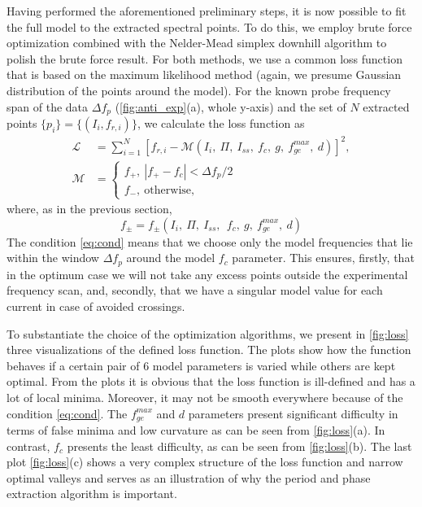 \documentclass[%
 aip,
 amsmath,amssymb,
 reprint,%
]{revtex4-1}
\begin{document}
Having performed the aforementioned preliminary steps, it is now possible to fit the full model to the extracted spectral points. To do this, we employ brute force optimization combined with the Nelder-Mead simplex downhill algorithm\cite{nelder1965} to polish the brute force result. For both methods, we use a common loss function that is based on the maximum likelihood method (again, we presume Gaussian distribution of the points around the model). 
For the known probe frequency span of the data $\Delta f_p$ (\autoref{fig:anti_exp}(a), whole y-axis) and the set of $N$ extracted points $\{p_i\} = \{(I_i, f_{r,i})\}$, we calculate the loss function as
\begin{align}
\mathcal{L} &= \sum_{i=1}^N [f_{r,i} - \mathcal{M}(I_i,\ \Pi, \ I_{ss},\ f_c,\ g,\ f_{ge}^{max},\ d)]^2,\label{eq:loss}\\
\mathcal{M} &= \begin{cases}
f_+,\  |f_+ - f_c|< \Delta f_p/2 \\
f_-,\ \text{otherwise}, \label{eq:cond}
\end{cases}
\end{align}
where, as in the previous section, $$f_{\pm} = f_{\pm}(I_i,\ \Pi,\ I_{ss},\ \ f_c,\ g,\ f_{ge}^{max},\ d)$$
The condition \eqref{eq:cond} means that we choose only the model frequencies that lie within the window $\Delta f_p$ around the model $f_c$ parameter. This ensures, firstly, that in the optimum case we will not take any excess points outside the experimental frequency scan, and, secondly, that we have a singular model value for each current in case of avoided crossings.

To substantiate the choice of the optimization algorithms, we present in \autoref{fig:loss} three visualizations of the defined loss function. The plots show how the function behaves if a certain pair of 6 model parameters is varied while others are kept optimal. From the plots it is obvious that the loss function is ill-defined and has a lot of local minima. Moreover, it may not be smooth everywhere because of the condition \eqref{eq:cond}. The $f^{max}_{ge}$ and $d$ parameters present significant difficulty in terms of false minima and low curvature as can be seen from \autoref{fig:loss}(a). In contrast, $f_c$ presents the least difficulty, as can be seen from \autoref{fig:loss}(b). The last plot \autoref{fig:loss}(c) shows a very complex structure of the loss function and narrow optimal valleys and serves as an illustration of why the period and phase extraction algorithm is important.
\end{document}
